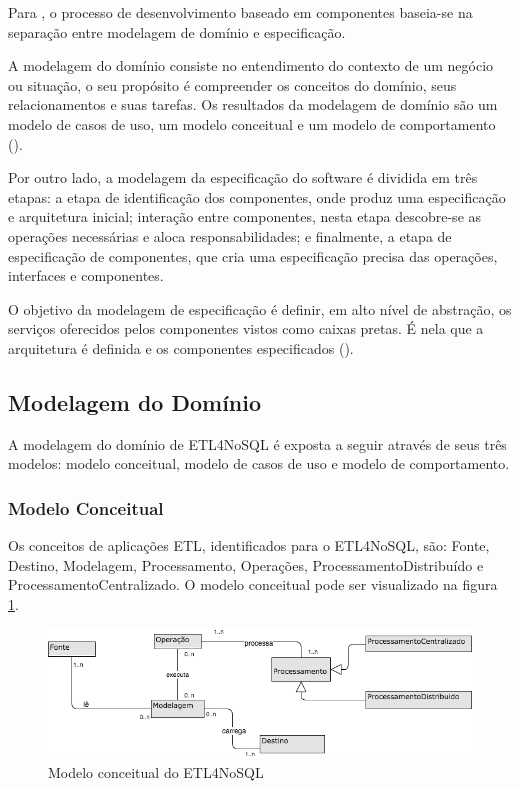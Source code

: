 Para \cite{cheesman:2001}, o processo de desenvolvimento baseado em componentes baseia-se na separação entre modelagem de domínio e especificação.

A modelagem do domínio consiste no entendimento do contexto de um negócio ou situação, o seu propósito é compreender os conceitos do domínio, seus relacionamentos e suas tarefas. Os resultados da modelagem de domínio são um modelo de casos de uso, um modelo conceitual e um modelo de comportamento (\cite{itana:2005}).

Por outro lado, a modelagem da especificação do software é dividida em três etapas: a etapa de identificação dos componentes, onde produz uma especificação e arquitetura inicial; interação entre componentes, nesta etapa descobre-se as operações necessárias e aloca responsabilidades; e finalmente, a etapa de especificação de componentes, que cria uma especificação precisa das operações, interfaces e componentes.  

O objetivo da modelagem de especificação é definir, em alto nível de abstração, os serviços oferecidos pelos componentes vistos como caixas pretas. É nela que a arquitetura é definida e os componentes especificados (\cite{itana:2005}).

\subsection{Modelagem do Domínio}

A modelagem do domínio de ETL4NoSQL é exposta a seguir através de seus três modelos: modelo conceitual, modelo de casos de uso e modelo de comportamento.

\subsubsection{Modelo Conceitual}

Os conceitos de aplicações ETL, identificados para o ETL4NoSQL, são: Fonte, Destino, Modelagem, Processamento, Operações, ProcessamentoDistribuído e ProcessamentoCentralizado. O modelo conceitual pode ser visualizado na figura \ref{modeloconceitual}.

\begin{figure}[h]
	\centering
	\includegraphics[scale=0.6]{fig/modeloconceitual.png}
	\caption{Modelo conceitual do ETL4NoSQL}
	\label{modeloconceitual}
\end{figure}

